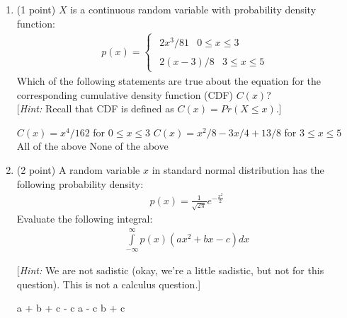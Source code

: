 \begin{enumerate}[start]
\begin{oneparcheckboxes}
\choice $\frac{1}{p(1-p)}$
\choice $\frac{1}{1 + p^2}$
\choice $\frac{2p}{1 - p}$
\choice A fair outcome cannot be generated with a biased coin
\end{oneparcheckboxes}

\vspace{0.5cm}

\item (1 point)
$X$ is a continuous random variable with probability density function:
%
\begin{align}
p(x) = \left\{ {\begin{array}{*{20}{c}}
{\begin{array}{*{20}{c}}
{2x^3/81}&{0 \le x \le 3}
\end{array}}\\
{\begin{array}{*{20}{c}}
{2(x-3)/8}&{3\le x \le 5}
\end{array}}
\end{array}} \right.
\end{align}
%
Which of the following statements are true about the equation for the corresponding cumulative density function (CDF) $C(x)$?\\
{[\emph{Hint:} Recall that CDF is defined as $C(x) = Pr(X \le x)$.]}\\
\begin{checkboxes}
	\choice $C(x) = x^4/162$  for   $0 \le x \le 3 $
	\choice $C(x) = x^2/8 -3x/4 + 13/8$ for  $3 \le x \le 5$
	\choice All of the above
	\choice None of the above
\end{checkboxes}

\item (2 point) A random variable $x$ in standard normal distribution 
has the following probability density:
%
\begin{align}
p(x) = \frac{1}{{\sqrt {2\pi } }}{e^{ - \frac{{{x^2}}}{2}}}
\end{align}
%
Evaluate the following integral:
%
\begin{align}
\int\limits_{ - \infty }^\infty  {p(x)(a{x^2} + b{x} - c)dx}
\end{align}

[\emph{Hint:} We are not sadistic (okay, we're a little sadistic, but not for this question). This is not a calculus question.]\\

\begin{oneparcheckboxes}
	\choice a + b + c
	\choice - c
	\choice a - c
	\choice b + c
\end{oneparcheckboxes}


\end{enumerate}
